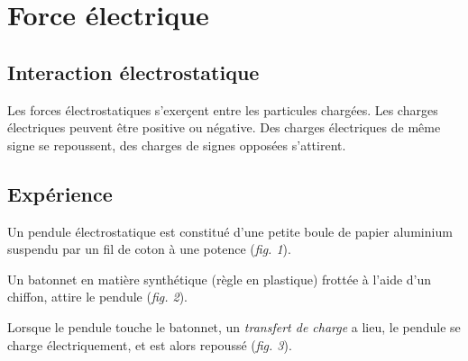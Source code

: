 
\section{Force électrique}
%
\subsection{Interaction électrostatique}
Les forces électrostatiques s'exerçent entre les particules chargées. Les charges électriques peuvent être positive ou négative.
Des charges électriques de même signe se repoussent, des charges de signes opposées s'attirent.

\subsection{Expérience}
Un pendule électrostatique est constitué d'une petite boule de papier aluminium suspendu par un fil de coton à une potence ({\it fig. 1}).
 
Un batonnet en matière synthétique (règle en plastique) frottée à l'aide d'un chiffon, attire le pendule ({\it fig. 2}).

Lorsque le pendule touche le batonnet, un {\it transfert de charge} a lieu, le pendule se charge électriquement, et est alors repoussé ({\it fig. 3}).

